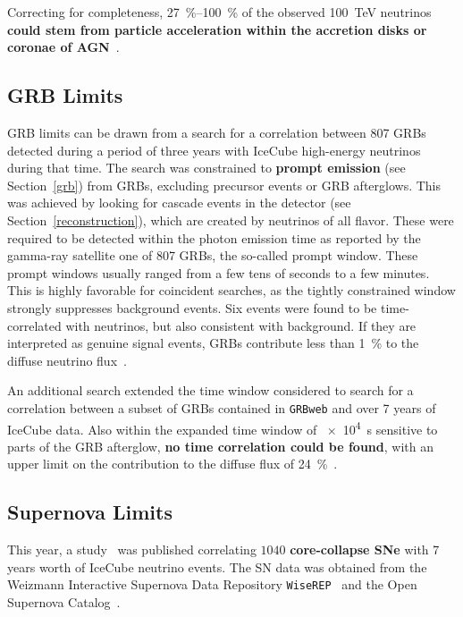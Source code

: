 Correcting for completeness, \SIrange{27}{100}{\percent} of the observed \SI{100}{\tera\eV} neutrinos \textbf{could stem from particle acceleration within the accretion disks or coronae of AGN}~\cite{Abbasi2022c}.

\subsection{GRB Limits}
GRB limits can be drawn from a search for a correlation between 807 GRBs detected during a period of three years with IceCube high-energy neutrinos during that time. The search was constrained to \textbf{prompt emission} (see Section~\ref{grb}) from GRBs, excluding precursor events or GRB afterglows. This was achieved by looking for cascade events in the detector (see Section~\ref{reconstruction}), which are created by neutrinos of all flavor. These were required to be detected within the photon emission time as reported by the gamma-ray satellite one of 807 GRBs, the so-called prompt window. These prompt windows usually ranged from a few tens of seconds to a few minutes. This is highly favorable for coincident searches, as the tightly constrained window strongly suppresses background events. Six events were found to be time-correlated with neutrinos, but also consistent with background. If they are interpreted as genuine signal events, GRBs contribute less than \SI{1}{\percent} to the diffuse neutrino flux~.

An additional search extended the time window considered to search for a correlation between a subset of GRBs contained in \texttt{GRBweb} and over 7 years of IceCube data. Also within the expanded time window of \SI{e4}{s} sensitive to parts of the GRB afterglow, \textbf{no time correlation could be found}, with an upper limit on the contribution to the diffuse flux of \SI{24}{\percent}~.

\subsection{Supernova Limits}
This year, a study~ was published correlating $1040$ \textbf{core-collapse SNe} with 7 years worth of IceCube neutrino events. The SN data was obtained from the Weizmann Interactive Supernova Data Repository \texttt{WiseREP}~ and the Open Supernova Catalog~.

